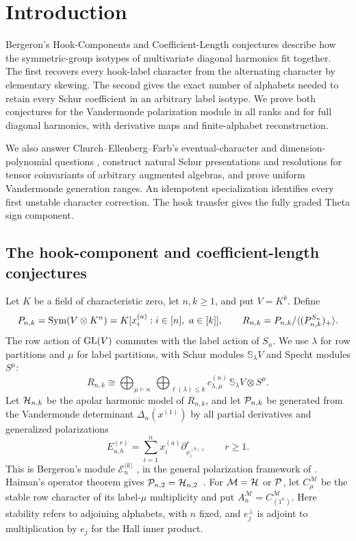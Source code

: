 \section{Introduction}

Bergeron's Hook-Components and Coefficient-Length conjectures
\cite[Conjectures~2 and~3]{Bergeron} describe how the symmetric-group
isotypes of multivariate diagonal harmonics fit together.  The first
recovers every hook-label character from the alternating character by
elementary skewing.  The second gives the exact number of alphabets
needed to retain every Schur coefficient in an arbitrary label
isotype.  We prove both conjectures for the Vandermonde polarization
module in all ranks and for full diagonal harmonics, with derivative
maps and finite-alphabet reconstruction.

We also answer Church--Ellenberg--Farb's eventual-character and
dimension-polynomial questions \cite[Problems~1.10 and~1.12]{ChurchEllenbergFarb2015},
construct natural Schur presentations and resolutions for tensor
coinvariants of arbitrary augmented algebras, and prove uniform
Vandermonde generation ranges. An idempotent specialization identifies
every first unstable character correction.
The hook transfer gives the fully graded Theta sign component.

\subsection{The hook-component and coefficient-length conjectures}

Let $K$ be a field of characteristic zero, let $n,k\ge1$, and put $V=K^k$.
Define
\[
 P_{n,k}=\operatorname{Sym}(V\otimes K^n)
       =K[x_i^{(a)}:i\in[n],\ a\in[k]],\qquad
 R_{n,k}=P_{n,k}/\langle(P_{n,k}^{S_n})_+\rangle.
\]
The row action of $\operatorname{GL}(V)$ commutes with the label action of $S_n$.
We use $\lambda$ for row partitions and $\mu$ for label partitions,
with Schur modules $\mathbb S_\lambda V$ and Specht modules $S^\mu$:
\begin{equation}\label{eq:character-decomposition}
 R_{n,k}\cong
 \bigoplus_{\mu\vdash n}\ \bigoplus_{\ell(\lambda)\le k}
 c_{\lambda,\mu}^{(n)}\,
                 \mathbb S_\lambda V\otimes S^\mu.
\end{equation}
Let $\mathcal H_{n,k}$ be the apolar harmonic model of $R_{n,k}$, and
let $\mathcal P_{n,k}$ be generated from the Vandermonde determinant
$\Delta_n(x^{(1)})$ by all partial
derivatives and generalized polarizations
\[
 E_{a,b}^{(r)}=\sum_{i=1}^n
             x_i^{(a)}\partial_{x_i^{(b)}}^r,\qquad r\ge1.
\]
This is Bergeron's module $\mathcal E_n^{\langle k\rangle}$
\cite[Section~2]{Bergeron}, in the general polarization framework of
\cite[Section~3.1]{r5-Blandin}.  Haiman's operator theorem gives
$\mathcal P_{n,2}=\mathcal H_{n,2}$~\cite[Theorem~4.2]{Haiman}.
For $\mathcal M=\mathcal H$ or $\mathcal P$, let $C_\mu^{\mathcal M}$ be the
stable row character of its label-$\mu$ multiplicity and put
$A_n^{\mathcal M}=C_{(1^n)}^{\mathcal M}$.  Here stability refers to
adjoining alphabets, with $n$ fixed, and $e_j^\perp$ is adjoint to
multiplication by $e_j$ for the Hall inner product.

